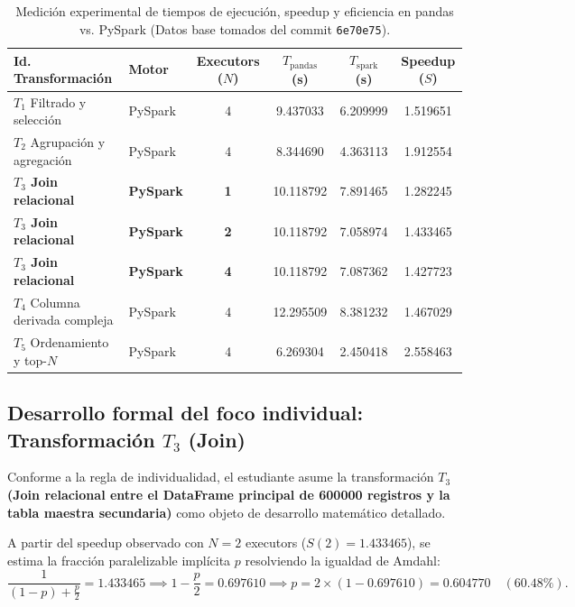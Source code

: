 \documentclass[11pt,a4paper]{article}
\begin{document}
\begin{table}[H]
\centering
\caption{Medición experimental de tiempos de ejecución, speedup y eficiencia en pandas vs. PySpark (Datos base tomados del commit \texttt{6e70e75}).}
\label{tab:tiempos_base}
\begin{tabular}{llcccc}
\toprule
\textbf{Id. Transformación} & \textbf{Motor} & \textbf{Executors ($N$)} & \textbf{$T_{\text{pandas}}$ (\si{\second})} & \textbf{$T_{\text{spark}}$ (\si{\second})} & \textbf{Speedup ($S$)} \\
\midrule
$T_1$ Filtrado y selección & PySpark & 4 & \num{9.437033} & \num{6.209999} & \num{1.519651} \\
$T_2$ Agrupación y agregación & PySpark & 4 & \num{8.344690} & \num{4.363113} & \num{1.912554} \\
\textbf{$T_3$ Join relacional} & \textbf{PySpark} & \textbf{1} & \num{10.118792} & \num{7.891465} & \num{1.282245} \\
\textbf{$T_3$ Join relacional} & \textbf{PySpark} & \textbf{2} & \num{10.118792} & \num{7.058974} & \num{1.433465} \\
\textbf{$T_3$ Join relacional} & \textbf{PySpark} & \textbf{4} & \num{10.118792} & \num{7.087362} & \num{1.427723} \\
$T_4$ Columna derivada compleja & PySpark & 4 & \num{12.295509} & \num{8.381232} & \num{1.467029} \\
$T_5$ Ordenamiento y top-$N$ & PySpark & 4 & \num{6.269304} & \num{2.450418} & \num{2.558463} \\
\bottomrule
\end{tabular}
\end{table}

\subsection{Desarrollo formal del foco individual: Transformación \texorpdfstring{$T_3$}{T3} (Join)}

Conforme a la regla de individualidad, el estudiante asume la transformación \textbf{$T_3$ (Join relacional entre el DataFrame principal de \num{600000} registros y la tabla maestra secundaria)} como objeto de desarrollo matemático detallado.

A partir del speedup observado con $N=2$ executors ($S(2) = \num{1.433465}$), se estima la fracción paralelizable implícita $p$ resolviendo la igualdad de Amdahl:
\[
\frac{1}{(1-p) + \frac{p}{2}} = 1.433465 \implies 1 - \frac{p}{2} = 0.697610 \implies p = 2 \times (1 - 0.697610) = 0.604770 \quad (60.48\%).
\]
\end{document}
